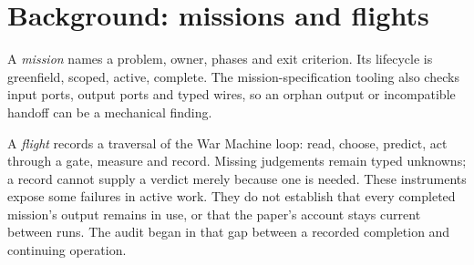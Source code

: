 \section{Background: missions and flights}\label{sec:background-missions}

A \emph{mission} names a problem, owner, phases and exit criterion. Its
lifecycle is greenfield, scoped, active, complete. The mission-specification
tooling also checks input ports, output ports and typed wires, so an orphan
output or incompatible handoff can be a mechanical finding.

A \emph{flight} records a traversal of the War Machine loop: read, choose,
predict, act through a gate, measure and record. Missing judgements remain
typed unknowns; a record cannot supply a verdict merely because one is needed.
These instruments expose some failures in active work. They do not establish
that every completed mission's output remains in use, or that the paper's
account stays current between runs. The audit began in that gap between a
recorded completion and continuing operation.
